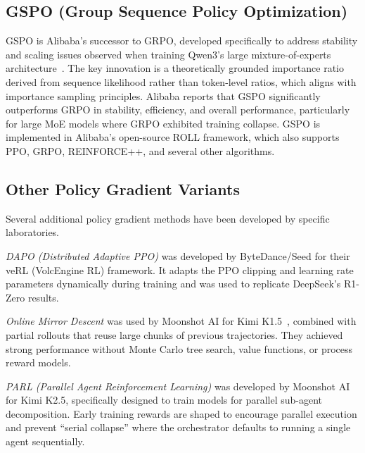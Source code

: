 \documentclass[12pt]{article}
\begin{document}
\subsection{GSPO (Group Sequence Policy Optimization)}

GSPO is Alibaba's successor to GRPO, developed specifically to address stability and scaling issues observed when training Qwen3's large mixture-of-experts architecture~\cite{Qwen2025GSPO}. The key innovation is a theoretically grounded importance ratio derived from sequence likelihood rather than token-level ratios, which aligns with importance sampling principles. Alibaba reports that GSPO significantly outperforms GRPO in stability, efficiency, and overall performance, particularly for large MoE models where GRPO exhibited training collapse. GSPO is implemented in Alibaba's open-source ROLL framework, which also supports PPO, GRPO, REINFORCE++, and several other algorithms.

\subsection{Other Policy Gradient Variants}

Several additional policy gradient methods have been developed by specific laboratories.

\textit{DAPO (Distributed Adaptive PPO)} was developed by ByteDance/Seed for their veRL (VolcEngine RL) framework. It adapts the PPO clipping and learning rate parameters dynamically during training and was used to replicate DeepSeek's R1-Zero results.

\textit{Online Mirror Descent} was used by Moonshot AI for Kimi K1.5~\cite{Kimi2025K15}, combined with partial rollouts that reuse large chunks of previous trajectories. They achieved strong performance without Monte Carlo tree search, value functions, or process reward models.

\textit{PARL (Parallel Agent Reinforcement Learning)} was developed by Moonshot AI for Kimi K2.5, specifically designed to train models for parallel sub-agent decomposition. Early training rewards are shaped to encourage parallel execution and prevent ``serial collapse'' where the orchestrator defaults to running a single agent sequentially.
\end{document}
